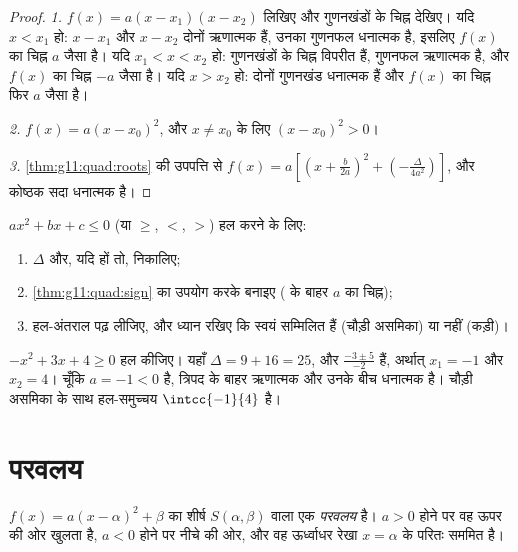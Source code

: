 \begin{proof}
\emph{1.} $f(x) = a(x-x_1)(x-x_2)$ लिखिए और गुणनखंडों के चिह्न देखिए। यदि $x < x_1$ हो: $x - x_1$ और
$x - x_2$ दोनों ऋणात्मक हैं, उनका गुणनफल धनात्मक है, इसलिए $f(x)$ का चिह्न $a$
जैसा है। यदि $x_1 < x < x_2$ हो: गुणनखंडों के चिह्न विपरीत हैं, गुणनफल ऋणात्मक है, और
$f(x)$ का चिह्न $-a$ जैसा है। यदि $x > x_2$ हो: दोनों गुणनखंड धनात्मक हैं और
$f(x)$ का चिह्न फिर $a$ जैसा है।

\emph{2.} $f(x) = a(x - x_0)^2$, और $x \neq x_0$ के लिए $(x-x_0)^2 > 0$।

\emph{3.} \cref{thm:g11:quad:roots} की उपपत्ति से $f(x) = a\left[\left(x + \frac{b}{2a}\right)^2 +
\left(-\frac{\Delta}{4a^2}\right)\right]$, और कोष्ठक सदा धनात्मक है।
\end{proof}

\begin{method}\label{met:g11:quad:inequalities}
$ax^2 + bx + c \leq 0$ (या $\geq$, $<$, $>$) हल करने के लिए:
\begin{enumerate}
  \item $\Delta$ और, यदि हों तो,  निकालिए;
  \item \cref{thm:g11:quad:sign} का उपयोग करके  बनाइए ( के बाहर $a$ का
        चिह्न);
  \item हल-अंतराल पढ़ लीजिए, और ध्यान रखिए कि  स्वयं सम्मिलित हैं (चौड़ी
        असमिका) या नहीं (कड़ी)।
\end{enumerate}
\end{method}

\begin{example}\label{ex:g11:quad:inequality}
$-x^2 + 3x + 4 \geq 0$ हल कीजिए। यहाँ $\Delta = 9 + 16 = 25$, और  $\frac{-3 \pm 5}{-2}$ हैं, अर्थात् $x_1 = -1$ और $x_2 = 4$।
चूँकि $a = -1 < 0$ है, त्रिपद  के बाहर ऋणात्मक और उनके बीच धनात्मक है। चौड़ी
असमिका के साथ हल-समुच्चय $\intcc{-1}{4}$ है।
\end{example}

\section{परवलय}

\begin{definition}[परवलय]\label{def:g11:quad:parabola}
 $f(x) = a(x-\alpha)^2+\beta$ का  शीर्ष $S(\alpha, \beta)$ वाला एक
\emph{परवलय} है। $a > 0$ होने पर वह ऊपर की ओर खुलता है, $a < 0$
होने पर नीचे की ओर, और वह ऊर्ध्वाधर रेखा $x = \alpha$ के परितः सममित है।
\end{definition}

